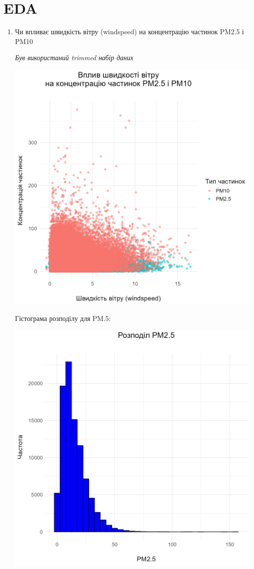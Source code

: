 \documentclass[./report.tex]{subfiles}
\begin{document}
\section{EDA}

\begin{enumerate}
  \item Чи впливає швидкість вітру (windspeed) на концентрацію частинок PM2.5 і PM10
    
  \quad \textit{Був використаний trimmed набір даних}

  \includegraphics[width=6in]{plots/question1/wind_speed_vs_pm.png}

  Гістограма розподілу для PM.5:
    
  \includegraphics[width=6in]{plots/question1/pm2_5_gist.png}


\end{enumerate}
\end{document}

